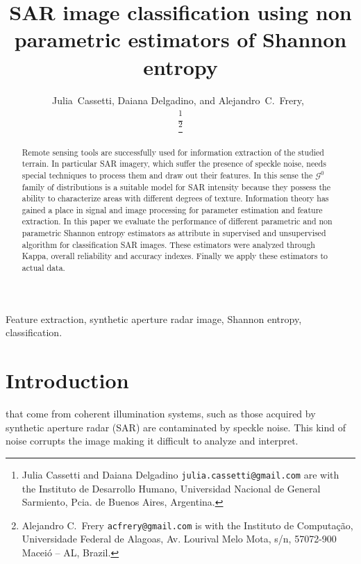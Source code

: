\documentclass[journal]{IEEEtran}
\begin{document}
\title{SAR image classification using non parametric estimators of Shannon entropy}
\author{ Julia~Cassetti, Daiana Delgadino, and Alejandro~C.~Frery,~


\thanks{Julia Cassetti and Daiana Delgadino \texttt{julia.cassetti@gmail.com} are with the  Instituto de Desarrollo Humano, Universidad Nacional de General Sarmiento, Pcia. de Buenos Aires, Argentina.}

\thanks{Alejandro C.\ Frery \texttt{acfrery@gmail.com} is with the Instituto de Computa\c c\~ao, Universidade Federal de Alagoas, 
Av. Lourival Melo Mota, s/n, 57072-900 Macei\'o -- AL, Brazil.} 
}

\maketitle

\begin{abstract}
	
Remote sensing tools are successfully used for information extraction of the studied terrain. In particular SAR imagery, which suffer the presence of speckle noise, needs special techniques to process them and draw out their features. In this sense the $\mathcal G^0$ family of distributions is a suitable model for SAR intensity because they possess the ability to characterize areas with different degrees of texture. 
Information theory has gained a place in signal and image processing for parameter estimation and feature extraction.
In this paper we evaluate the performance of different parametric and non parametric Shannon entropy estimators as attribute in supervised and unsupervised algorithm for classification SAR images.
These estimators were analyzed through Kappa, overall reliability and accuracy indexes. Finally we
apply these estimators to actual data.

\end{abstract}

\begin{keywords}
Feature extraction, synthetic aperture radar image, Shannon entropy, classification.
\end{keywords}

\IEEEpeerreviewmaketitle

\section{Introduction}
\label{intro}
 that come from coherent illumination systems, such as those acquired by synthetic aperture radar (SAR) are contaminated by speckle noise. This kind of noise corrupts the image making it difficult to analyze and interpret. 
\end{document}
